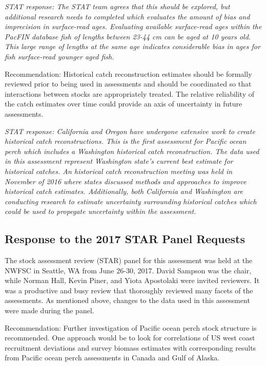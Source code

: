 \documentclass[12pt,]{article}
\begin{document}
\emph{STAT response: The STAT team agrees that this should be explored,
but additional research needs to completed which evaluates the amount of
bias and imprecision in surface-read ages. Evaluating available
surface-read ages within the PacFIN database fish of lengths between
23-44 cm can be aged at 10 years old. This large range of lengths at the
same age indicates considerable bias in ages for fish surface-read
younger aged fish.}

Recommendation: Historical catch reconstruction estimates should be
formally reviewed prior to being used in assessments and should be
coordinated so that interactions between stocks are appropriately
treated. The relative reliability of the catch estimates over time could
provide an axis of uncertainty in future assessments.

\emph{STAT response: California and Oregon have undergone extensive work
to create historical catch reconstructions. This is the first assessment
for Pacific ocean perch which includes a Washington historical catch
reconstruction. The data used in this assessment represent Washington
state's current best estimate for historical catches. An historical
catch reconstruction meeting was held in November of 2016 where states
discussed methods and approaches to improve historical catch estimates.
Additionally, both California and Washington are conducting research to
estimate uncertainty surrounding historical catches which could be used
to propegate uncertainty within the assessment.}

\subsection{Response to the 2017 STAR Panel
Requests}\label{response-to-the-2017-star-panel-requests}

The stock assessment review (STAR) panel for this assessment was held at
the NWFSC in Seattle, WA from June 26-30, 2017. David Sampson was the
chair, while Norman Hall, Kevin Piner, and Yiota Apostolaki were invited
reviewers. It was a productive and busy review that thoroughly reviewed
many facets of the assessments. As mentioned above, changes to the data
used in this assessment were made during the panel.

Recommendation: Further investigation of Pacific ocean perch stock
structure is recommended. One approach would be to look for correlations
of US west coast recruitment deviations and survey biomass estimates
with corresponding results from Pacific ocean perch assessments in
Canada and Gulf of Alaska.
\end{document}

